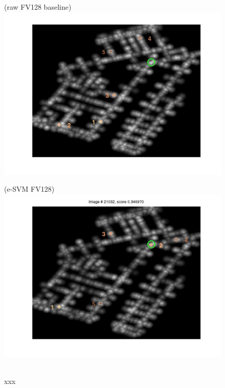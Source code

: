 \documentclass[10pt,onecolumn,A4]{article}
\begin{document}
\begin{figure}
	\begin{minipage}{0.45\linewidth}
		\center
		(raw FV128 baseline) \\
		\includegraphics[trim = 55mm 40mm 55mm 25mm, clip=true,width=\linewidth]{sup1383/heatRaw.jpg}
	\end{minipage} 
	\begin{minipage}{0.45\linewidth}
		\center
		(e-SVM FV128) \\
		\includegraphics[trim = 55mm 40mm 55mm 25mm, clip=true,width=\linewidth]{sup1383/heatSvm.jpg}
	\end{minipage} 
	\\
	\textcolor{myWhite}{xxx}\\

\end{figure}
\end{document}

